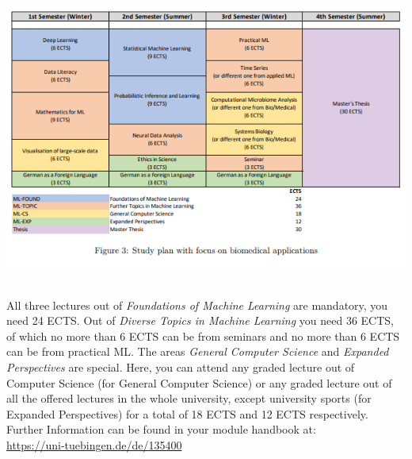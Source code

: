 \begin{center}
\includegraphics[scale=0.65]{media/ML_Biomed}~\\
\end{center}

All three lectures out of \emph{Foundations of Machine Learning} are mandatory, you need 24 ECTS. Out of \emph{Diverse Topics in Machine Learning} you need 36 ECTS, of which no more than 6 ECTS can be from seminars and no more than 6 ECTS can be from practical ML. The areas \emph{General Computer Science} and \emph{Expanded Perspectives} are special. Here, you can attend any graded lecture out of Computer Science (for General Computer Science) or any graded lecture out
of all the offered lectures in the whole university, except university sports (for Expanded Perspectives) for a total of 18 ECTS and 12 ECTS respectively.
Further Information can be found in your module handbook at:\\
\url{https://uni-tuebingen.de/de/135400}
